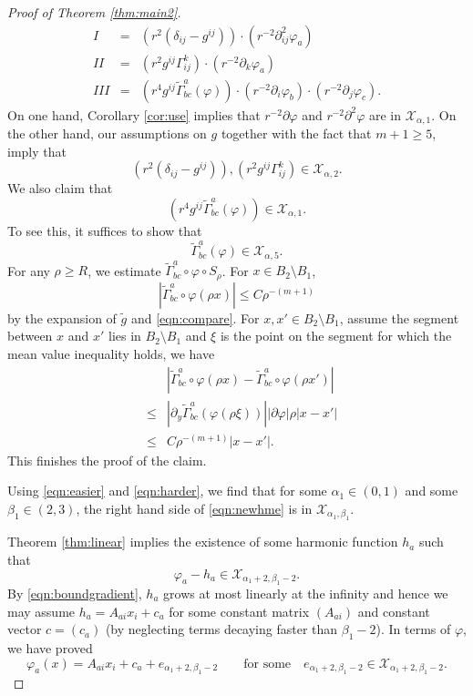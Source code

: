 \documentclass{amsart}
\newcommand{\abs}[1]{\left\vert#1\right\vert}
\numberwithin{equation}{section}
\begin{document}
\begin{proof}[Proof of Theorem \ref{thm:main2}]
	\begin{eqnarray*}
		I&=&  (r^{2}(\delta_{ij}-g^{ij})) \cdot (r^{-2} \partial^2_{ij} \varphi_a) \\
		II&=&  (r^{2}g^{ij}\Gamma^k_{ij}) \cdot (r^{-2} \partial_k \varphi_a) \\
		III &=& (r^{4 }g^{ij} \tilde{\Gamma}^a_{bc}(\varphi))\cdot (r^{-2} \partial_i \varphi_b)\cdot (r^{-2} \partial_j \varphi_c).
	\end{eqnarray*}
	On one hand, Corollary \ref{cor:use} implies that $r^{-2}\partial \varphi$ and $r^{-2} \partial^2 \varphi$ are in $\mathcal X_{\alpha,1}$. On the other hand, our assumptions on $g$ together with the fact that $m+1\geq 5$, imply that 
	\begin{equation}
		\label{eqn:easier}
		(r^{2}(\delta_{ij}-g^{ij})), (r^{2}g^{ij}\Gamma^k_{ij})\in \mathcal X_{\alpha,2}.
	\end{equation}
	We also claim that
	\begin{equation}
		\label{eqn:harder}
		(r^{4}g^{ij} \tilde{\Gamma}^a_{bc}(\varphi)) \in \mathcal X_{\alpha,1}.
	\end{equation}
	To see this, it suffices to show that
	\[
		\tilde{\Gamma}^a_{bc}(\varphi) \in \mathcal X_{\alpha,5}.
	\]
	For any $\rho\geq R$, we estimate $\tilde{\Gamma}^a_{bc}\circ \varphi \circ S_\rho$. For $x\in B_2\setminus B_1$,
	\[
		\abs{\tilde{\Gamma}^a_{bc}\circ \varphi (\rho x)}\leq C \rho^{-(m+1)}
	\]
	by the expansion of $\tilde{g}$ and \eqref{eqn:compare}. For $x,x'\in B_2\setminus B_1$, assume the segment between $x$ and $x'$ lies in $B_2\setminus B_1$ and $\xi$ is the point on the segment for which the mean value inequality holds, we have
	\begin{eqnarray*}
	&&\abs{\tilde\Gamma^a_{bc}\circ \varphi(\rho x) - \tilde \Gamma^a_{bc}\circ \varphi(\rho x')} \\
	&\leq& \abs{\partial_y \tilde \Gamma^a_{bc}(\varphi (\rho\xi)) }\abs{\partial \varphi} \rho \abs{x-x'} \\
	&\leq& C \rho^{-(m+1)} \abs{x-x'}.
	\end{eqnarray*}
	This finishes the proof of the claim.

	Using \eqref{eqn:easier} and \eqref{eqn:harder}, we find that for some $\alpha_1\in (0,1)$ and some $\beta_1\in (2,3)$,  the right hand side of \eqref{eqn:newhme} is in $\mathcal X_{\alpha_1,\beta_1}$.  

	Theorem \ref{thm:linear} implies the existence of some harmonic function $h_a$ such that
	\[
		\varphi_a - h_a \in \mathcal X_{\alpha_1+2,\beta_1-2}.
	\]
	By \eqref{eqn:boundgradient}, $h_a$ grows at most linearly at the infinity and hence we may assume $h_a=A_{ai}x_i+ c_a$ for some constant matrix $(A_{ai})$ and constant vector $c=(c_a)$ (by neglecting terms decaying faster than $\beta_1-2$). In terms of $\varphi$, we have proved
	\begin{equation}
		\label{eqn:preexp}
		\varphi_a(x)= A_{ai}x_i+ c_a + e_{\alpha_1+2,\beta_1-2} \qquad \text{for some} \quad e_{\alpha_1+2,\beta_1-2}\in \mathcal X_{\alpha_1+2,\beta_1-2}.
	\end{equation}


\end{proof}
\end{document}
